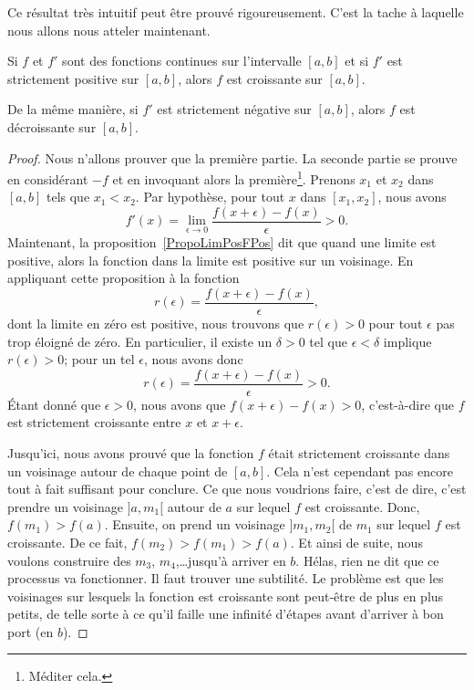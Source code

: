 Ce résultat très intuitif peut être prouvé rigoureusement. C'est la tache à laquelle nous allons nous atteler maintenant.

\begin{proposition} \label{PropGFkZMwD}
	Si \( f\) et \( f'\) sont des fonctions continues sur l'intervalle \( [a,b]\) et si \( f'\) est strictement positive sur \( [a,b]\), alors \( f\) est croissante sur \( [a,b]\).

	De la même manière, si \( f'\) est strictement négative sur \( [a,b]\), alors \( f\) est décroissante sur \( [a,b]\).
\end{proposition}

\begin{proof}
	Nous n'allons prouver que la première partie. La seconde partie se prouve en considérant \( -f\) et en invoquant alors la première\footnote{Méditer cela.}. Prenons \( x_1\) et \( x_2\) dans \( [a,b]\) tels que \( x_1<x_2\). Par hypothèse, pour tout \( x\) dans \( [x_1,x_2]\), nous avons
	\begin{equation}
		f'(x)=\lim_{\epsilon\to 0}\frac{ f(x+\epsilon)-f(x) }{\epsilon} >0.
	\end{equation}
	Maintenant, la proposition~\ref{PropoLimPosFPos} dit que quand une limite est positive, alors la fonction dans la limite est positive sur un voisinage. En appliquant cette proposition à la fonction
	\begin{equation}
		r(\epsilon)=\frac{ f(x+\epsilon)-f(x) }{ \epsilon },
	\end{equation}
	dont la limite en zéro est positive, nous trouvons que \( r(\epsilon)>0\) pour tout \( \epsilon\) pas trop éloigné de zéro. En particulier, il existe un \( \delta>0\) tel que \( \epsilon<\delta\) implique \( r(\epsilon)>0\); pour un tel \( \epsilon\), nous avons donc
	\begin{equation}
		r(\epsilon)=\frac{ f(x+\epsilon)-f(x) }{ \epsilon }>0.
	\end{equation}
	Étant donné que \( \epsilon>0\), nous avons que \( f(x+\epsilon)-f(x)>0\), c'est-à-dire que \( f\) est strictement croissante entre \( x\) et \( x+\epsilon\).

	Jusqu'ici, nous avons prouvé que la fonction \( f\) était strictement croissante dans un voisinage autour de chaque point de \( [a,b]\). Cela n'est cependant pas encore tout à fait suffisant pour conclure. Ce que nous voudrions faire, c'est de dire, c'est prendre un voisinage \( ]a,m_1[\) autour de \( a\) sur lequel \( f\) est croissante. Donc, \( f(m_1)>f(a)\). Ensuite, on prend un voisinage \( ]m_1,m_2[\) de \( m_1\) sur lequel \( f\) est croissante. De ce fait, \( f(m_2)>f(m_1)>f(a)\). Et ainsi de suite, nous voulons construire des \( m_3\), \( m_4\),\ldots jusqu'à arriver en \( b\). Hélas, rien ne dit que ce processus va fonctionner. Il faut trouver une subtilité. Le problème est que les voisinages sur lesquels la fonction est croissante sont peut-être de plus en plus petits, de telle sorte à ce qu'il faille une infinité d'étapes avant d'arriver à bon port (en \( b\)).


\end{proof}
